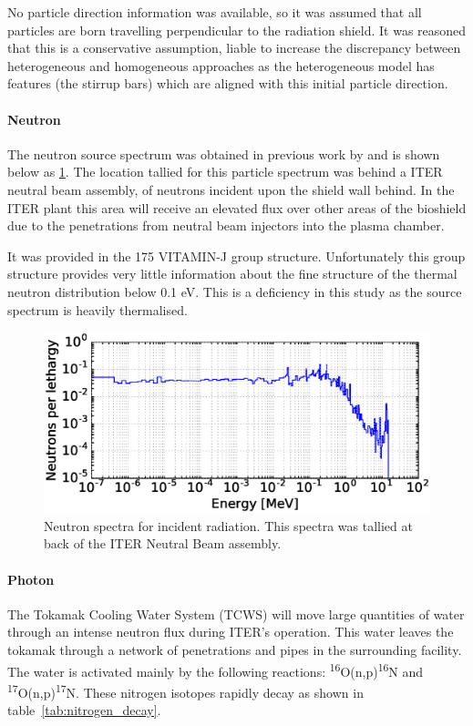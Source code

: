 No particle direction information was available, so it was assumed that all particles are born travelling perpendicular to the radiation shield. It was reasoned that this is a conservative assumption, liable to increase the discrepancy between heterogeneous and homogeneous approaches as the heterogeneous model has features (the stirrup bars) which are aligned with this initial particle direction.

\paragraph{Neutron}
The neutron source spectrum was obtained in previous work by \citeauthor{Jakhar16} and is shown below as \ref{fig:src_spectra}. The location tallied for this particle spectrum was behind a ITER neutral beam assembly, of neutrons incident upon the shield wall behind. In the ITER plant this area will receive an elevated flux over other areas of the bioshield due to the penetrations from neutral beam injectors into the plasma chamber.

It was provided in the 175 VITAMIN-J group structure. Unfortunately this group structure provides very little information about the fine structure of the thermal neutron distribution below 0.1 eV. This is a deficiency in this study as the source spectrum is heavily thermalised. 

\begin{figure}[H]
	\includegraphics[width=\textwidth]{src_spectra}
	\caption{Neutron spectra for incident radiation. This spectra was tallied at back of the ITER Neutral Beam assembly.}
	\label{fig:src_spectra}
\end{figure}

\paragraph{Photon}
The Tokamak Cooling Water System (TCWS) will move large quantities of water through an intense neutron flux during ITER's operation. This water leaves the tokamak through a network of penetrations and pipes in the surrounding facility. The water is activated mainly by the following reactions: \textsuperscript{16}O(n,p)\textsuperscript{16}N and \textsuperscript{17}O(n,p)\textsuperscript{17}N. These nitrogen isotopes rapidly decay as shown in table~\ref{tab:nitrogen_decay}.

